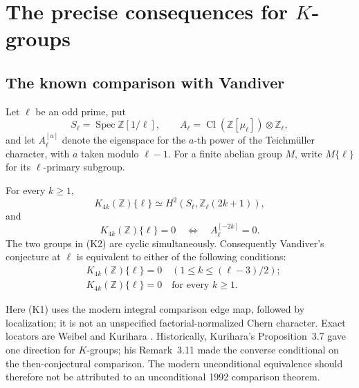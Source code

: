 
\section{The precise consequences for \texorpdfstring{$K$}{K}-groups}
\label{sec:k-groups}

\subsection{The known comparison with Vandiver}

Let \(\ell\) be an odd prime, put
\[
 S_\ell=\operatorname{Spec}\mathbb Z[1/\ell],\qquad
 A_\ell=\operatorname{Cl}(\mathbb Z[\mu_\ell])\otimes\mathbb Z_\ell,
\]
and let \(A_\ell^{[a]}\) denote the eigenspace for the \(a\)-th power
of the Teichm\"uller character, with \(a\) taken modulo \(\ell-1\).
For a finite abelian group \(M\), write \(M\{\ell\}\) for its
\(\ell\)-primary subgroup.

\begin{sourcefact}
For every \(k\ge1\),
\[
 K_{4k}(\mathbb Z)\{\ell\}
 \simeq H^2(S_\ell,\mathbb Z_\ell(2k+1)),                 \tag{K1}
\]
and
\[
 K_{4k}(\mathbb Z)\{\ell\}=0
 \quad\Longleftrightarrow\quad A_\ell^{[-2k]}=0.         \tag{K2}
\]
The two groups in (K2) are cyclic simultaneously.
Consequently Vandiver's conjecture at \(\ell\) is equivalent to either
of the following conditions:
\[
\begin{split}
 &K_{4k}(\mathbb Z)\{\ell\}=0
       \quad(1\le k\le(\ell-3)/2);\\
 &K_{4k}(\mathbb Z)\{\ell\}=0
       \quad\text{for every }k\ge1.
\end{split}
\tag{K3}
\]
\end{sourcefact}

Here (K1) uses the modern integral comparison edge map, followed by
localization; it is not an unspecified factorial-normalized Chern
character. Exact locators are Weibel \cite[VI.8.2, VI.8.3,
VI.10.9]{Weibel2013} and Kurihara
\cite[Lemma~1.2, Corollary~1.5, Proposition~3.7, Remark~3.11]{Kurihara1992}.
Historically, Kurihara's Proposition~3.7 gave one direction for
\(K\)-groups; his Remark~3.11 made the converse conditional on the
then-conjectural comparison. The modern unconditional equivalence
should therefore not be attributed to an unconditional 1992
comparison theorem.

